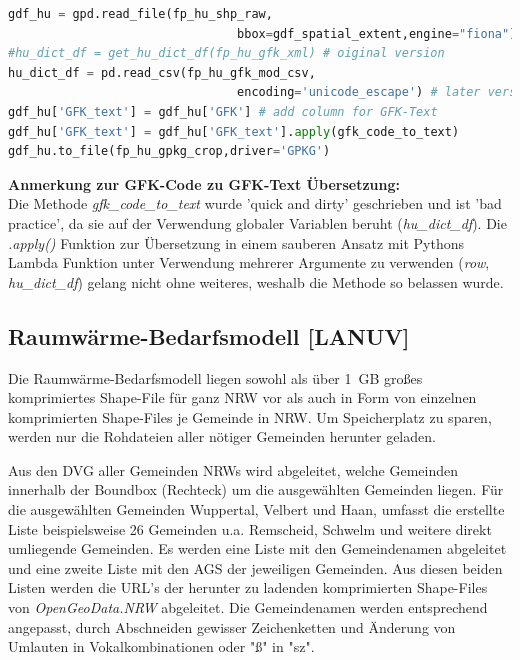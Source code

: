 			\begin{lstlisting}[language=Python, label=code:hu_gfk, caption={Python Minimal-Beispiel: Präprozessierung Hausumringe Datensatz},firstnumber=1234, emph={printf, schokostuecke}] 
gdf_hu = gpd.read_file(fp_hu_shp_raw,
								bbox=gdf_spatial_extent,engine="fiona")
#hu_dict_df = get_hu_dict_df(fp_hu_gfk_xml) # oiginal version
hu_dict_df = pd.read_csv(fp_hu_gfk_mod_csv, 
								encoding='unicode_escape') # later vers.
gdf_hu['GFK_text'] = gdf_hu['GFK'] # add column for GFK-Text
gdf_hu['GFK_text'] = gdf_hu['GFK_text'].apply(gfk_code_to_text)
gdf_hu.to_file(fp_hu_gpkg_crop,driver='GPKG')
			\end{lstlisting}
			
			\textbf{Anmerkung zur GFK-Code zu GFK-Text Übersetzung:}\\
			Die Methode \textit{gfk\_code\_to\_text} wurde 'quick and dirty' geschrieben und ist 'bad practice', da sie auf der Verwendung globaler Variablen beruht (\textit{hu\_dict\_df}). Die \textit{.apply()} Funktion zur Übersetzung in einem sauberen Ansatz mit Pythons Lambda Funktion unter Verwendung mehrerer Argumente zu verwenden (\textit{row}, \textit{hu\_dict\_df}) gelang nicht ohne weiteres, weshalb die Methode so belassen wurde.  
			
			

		\subsection{Raumwärme-Bedarfsmodell [LANUV]}
			Die Raumwärme-Bedarfsmodell liegen sowohl als über 1~GB großes komprimiertes Shape-File für ganz NRW vor als auch in Form von einzelnen komprimierten Shape-Files je Gemeinde in NRW. Um Speicherplatz zu sparen, werden nur die Rohdateien aller nötiger Gemeinden herunter geladen. 
			
			Aus den DVG aller Gemeinden NRWs wird abgeleitet, welche Gemeinden innerhalb der Boundbox (Rechteck) um die ausgewählten Gemeinden liegen. Für die ausgewählten Gemeinden Wuppertal, Velbert und Haan, umfasst die erstellte Liste beispielsweise 26 Gemeinden u.a. Remscheid, Schwelm und weitere direkt umliegende Gemeinden. Es werden eine Liste mit den Gemeindenamen abgeleitet und eine zweite Liste mit den AGS der jeweiligen Gemeinden. Aus diesen beiden Listen werden die URL's der herunter zu ladenden komprimierten Shape-Files von \textit{OpenGeoData.NRW} abgeleitet. Die Gemeindenamen werden entsprechend angepasst, durch Abschneiden gewisser Zeichenketten und Änderung von Umlauten in Vokalkombinationen oder "ß" in "sz". 
			
